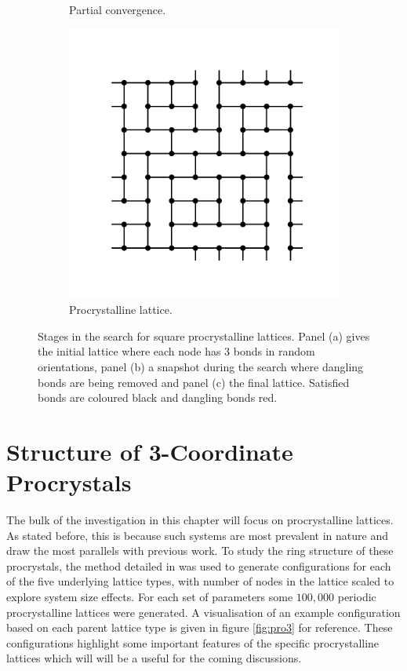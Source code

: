 \begin{figure}[bt]
\begin{subfigure}[b]{0.3\textwidth}
         \caption{Partial convergence.}
         \label{fig:promcb}
     \end{subfigure}
     \hfill
     \begin{subfigure}[b]{0.3\textwidth}
         \centering
         \includegraphics[width=\textwidth]{./figures/procrystals/pro_mc_4.pdf}
         \caption{Procrystalline lattice.}
         \label{fig:promcc}
     \end{subfigure}
     \hfill
     
     \caption{Stages in the \mc{} search for square procrystalline lattices. Panel (a) gives the initial lattice where each node has 3 bonds in random orientations, panel (b) a snapshot during the search where dangling bonds are being removed and panel (c) the final lattice. Satisfied bonds are coloured black and dangling bonds red.}
     \label{fig:promc}
\end{figure}

\section{Structure of 3\--Coordinate Procrystals}

The bulk of the investigation in this chapter will focus on procrystalline lattices. 
As stated before, this is because such systems are most prevalent in nature and draw the most parallels with previous work. 
To study the ring structure of these procrystals, the \mc{} method detailed in  was used to generate configurations for each of the five underlying lattice types, with number of nodes in the lattice scaled to explore system size effects.
For each set of parameters some $100,000$ periodic procrystalline lattices were generated.
A visualisation of an example configuration based on each parent lattice type is given in figure \ref{fig:pro3} for reference. 
These configurations highlight some important features of the specific procrystalline lattices which will will be a useful for the coming discussions.

